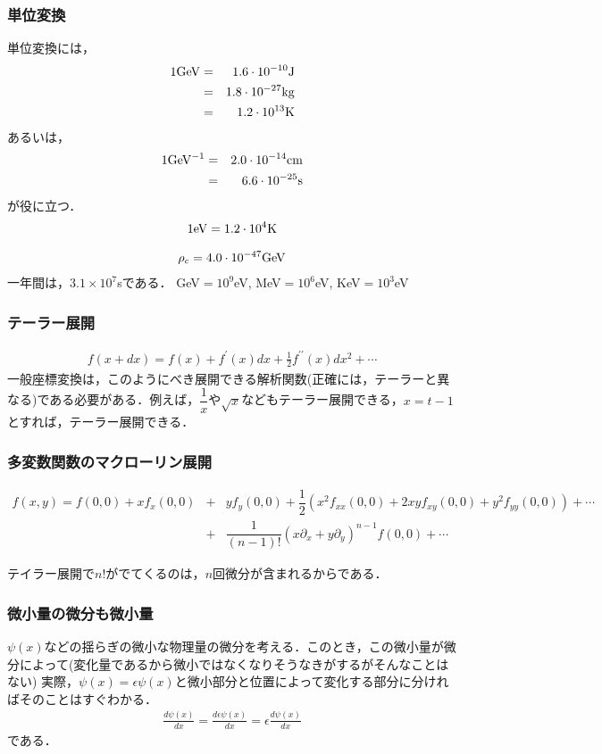 \subsubsection*{単位変換}
単位変換には，
\begin{eqnarray}
1\rm{GeV}&=&1.6\cdot10^{-10}\rm{J} \nonumber \\
&=&1.8\cdot10^{-27}\rm{kg} \nonumber \\
&=&1.2\cdot10^{13}\rm{K} \nonumber 
\end{eqnarray}
あるいは，
\begin{eqnarray}
1\rm{GeV^{-1}}&=&2.0\cdot10^{-14}\rm{cm} \nonumber \\
&=&6.6\cdot10^{-25}\rm{s} \nonumber 
\end{eqnarray}
が役に立つ．
\begin{eqnarray}
1\rm{eV}=1.2\cdot10^{4}\rm{K} \nonumber 
\end{eqnarray}

\begin{eqnarray}
\rho_{c}=4.0\cdot10^{-47}\rm{GeV} \nonumber 
\end{eqnarray}
一年間は，$3.1\times10^{7}$sである．
GeV$=10^{9}$eV, MeV$=10^{6}$eV,  KeV$=10^{3}$eV
\subsubsection*{テーラー展開}
\begin{eqnarray}
f(x+dx)=f(x)+f^{\prime}(x)dx+\frac{1}{2}f^{\prime\prime}(x)dx^2+\cdots
\end{eqnarray}
一般座標変換は，このようにべき展開できる解析関数(正確には，テーラーと異なる)である必要がある．例えば，$\dfrac{1}{x}$や$\sqrt{x}$などもテーラー展開できる，$x=t-1$とすれば，テーラー展開できる．


\subsubsection{多変数関数のマクローリン展開}
\begin{eqnarray}
f(x,y)=f(0,0)+xf_x(0,0) &+& yf_y(0,0)+\dfrac{1}{2}(x^2f_{xx}(0,0)+2xyf_{xy}(0,0)+y^2f_{yy}(0,0))+\cdots \nonumber \\
&+&\dfrac{1}{(n-1)!}(x\partial_x+y \partial_y)^{n−1}f(0,0)+\cdots
\end{eqnarray}

テイラー展開で$n!$がでてくるのは，$n$回微分が含まれるからである．

\subsubsection{微小量の微分も微小量}
$\psi(x)$などの揺らぎの微小な物理量の微分を考える．このとき，この微小量が微分によって(変化量であるから微小ではなくなりそうなきがするがそんなことはない)
実際，$\psi(x)=\epsilon\psi(x)$と微小部分と位置によって変化する部分に分ければそのことはすぐわかる．
\begin{eqnarray}
\frac{d\psi(x)}{dx}=\frac{d\epsilon\psi(x)}{dx}=\epsilon\frac{d\psi(x)}{dx}
\end{eqnarray}である．

